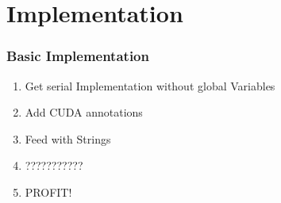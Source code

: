 \documentclass{beamer}
\begin{document}
\section{Implementation}

\begin{frame}
	\frametitle{Basic Implementation}
	\begin{enumerate}
		\item Get serial Implementation without global Variables
		\item Add CUDA annotations
		\item Feed with Strings
		\item ???????????
		\item PROFIT!
	\end{enumerate}
\end{frame}
\end{document}
